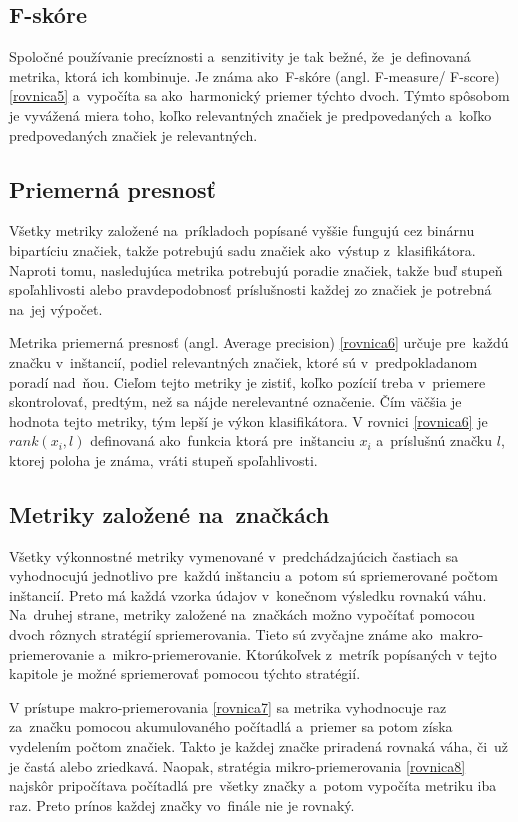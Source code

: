 \subsection*{F-skóre}
Spoločné používanie precíznosti a~senzitivity je tak bežné, že~je definovaná metrika, ktorá ich kombinuje. Je známa ako~F-skóre (angl. F-measure/ F-score) \eqref{rovnica5} a~vypočíta sa ako~harmonický priemer týchto dvoch. Týmto spôsobom je vyvážená miera toho, koľko relevantných značiek je predpovedaných a~koľko predpovedaných značiek je relevantných.

\subsection*{Priemerná presnosť}
Všetky metriky založené na~príkladoch popísané vyššie fungujú cez binárnu bipartíciu značiek, takže potrebujú sadu značiek ako~výstup z~klasifikátora. Naproti tomu, nasledujúca metrika potrebujú poradie značiek, takže buď stupeň spoľahlivosti alebo pravdepodobnosť príslušnosti každej zo značiek je potrebná na~jej výpočet.

Metrika priemerná presnosť (angl. Average precision) \eqref{rovnica6} určuje pre~každú značku v~inštancií, podiel relevantných značiek, ktoré sú v~predpokladanom poradí nad~ňou. Cieľom tejto metriky je zistiť, koľko pozícií treba v~priemere skontrolovať, predtým, než sa nájde nerelevantné označenie. Čím väčšia je hodnota tejto metriky, tým lepší je výkon klasifikátora.
V rovnici \eqref{rovnica6} je \(rank(x_{i},l)\) definovaná ako~funkcia ktorá pre~inštanciu \(x_{i}\) a~príslušnú značku \(l \), ktorej poloha je známa, vráti stupeň spoľahlivosti.


\subsection*{Metriky založené na~značkách}
Všetky výkonnostné metriky vymenované v~predchádzajúcich častiach sa vyhodnocujú jednotlivo pre~každú inštanciu a~potom sú spriemerované počtom inštancií. Preto má každá vzorka údajov v~konečnom výsledku rovnakú váhu. Na~druhej strane, metriky založené na~značkách možno vypočítať pomocou dvoch rôznych stratégií spriemerovania. Tieto sú zvyčajne známe ako~makro-priemerovanie a~mikro-priemerovanie. Ktorúkoľvek z~metrík popísaných v tejto kapitole je možné spriemerovať pomocou týchto stratégií.

V prístupe makro-priemerovania \eqref{rovnica7} sa metrika vyhodnocuje raz za~značku pomocou akumulovaného počítadlá a~priemer sa potom získa vydelením počtom značiek. Takto je každej značke priradená rovnaká váha, či~už je častá alebo zriedkavá. Naopak, stratégia mikro-priemerovania \eqref{rovnica8} najskôr pripočítava počítadlá pre~všetky značky a~potom vypočíta metriku iba raz. Preto prínos každej značky vo~finále nie je rovnaký.


